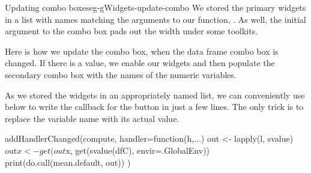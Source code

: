 \begin{example}{Updating combo boxes}{eg-gWidgets-update-combo}
We stored the primary widgets in a list with names matching the
arguments to our function, . As well, the
initial argument to the  combo box pads out the width under
some toolkits.

Here is how we update the  combo box, when the data frame
combo box is changed. If there is a value, we enable our widgets and
then populate the secondary combo box with the names of the numeric
variables.
\begin{Schunk}
\end{Schunk}
%

As we stored the widgets in an appropriately named list, we can
conveniently use  below to write the callback for
the  button in just a few lines. The only trick is to
replace the variable name with its actual value.
\begin{Schunk}
\begin{Sinput}
 addHandlerChanged(compute, handler=function(h,...) {
   out <- lapply(l, svalue)
   out$x <- get(out$x, get(svalue(dfC), envir=.GlobalEnv))
   print(do.call(mean.default, out))
 })
\end{Sinput}
\end{Schunk}

\end{example}



